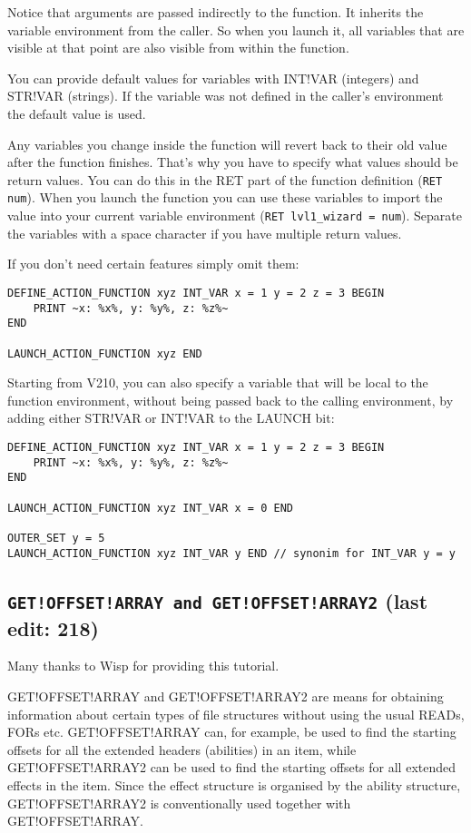 \documentclass{article}
\def\DEFINE#1{{\tt \bf #1}\label{#1}\index{#1}}
\begin{document}
Notice that arguments are passed indirectly to the function.
It inherits the variable environment from the caller. So when you launch it,
all variables that are visible at that point are also visible from within the function.

You can provide default values for variables with INT!VAR (integers) and STR!VAR (strings).
If the variable was not defined in the caller's environment the default value is used.

Any variables you change inside the function will revert back to their old value
after the function finishes.
That's why you have to specify what values should be return values.
You can do this in the RET part of the function definition (\verb+RET num+).
When you launch the function you can use these variables to import the value
into your current variable environment (\verb+RET lvl1_wizard = num+).
Separate the variables with a space character if you have multiple return values.

If you don't need certain features simply omit them:
\begin{verbatim}
DEFINE_ACTION_FUNCTION xyz INT_VAR x = 1 y = 2 z = 3 BEGIN
    PRINT ~x: %x%, y: %y%, z: %z%~
END

LAUNCH_ACTION_FUNCTION xyz END
\end{verbatim}

Starting from V210, you can also specify a variable that will be local to the
function environment, without being passed back to the calling environment,
by adding either STR!VAR or INT!VAR to the LAUNCH bit:
\begin{verbatim}
DEFINE_ACTION_FUNCTION xyz INT_VAR x = 1 y = 2 z = 3 BEGIN
    PRINT ~x: %x%, y: %y%, z: %z%~
END

LAUNCH_ACTION_FUNCTION xyz INT_VAR x = 0 END

OUTER_SET y = 5
LAUNCH_ACTION_FUNCTION xyz INT_VAR y END // synonim for INT_VAR y = y
\end{verbatim}

\subsection{\DEFINE{GET!OFFSET!ARRAY and GET!OFFSET!ARRAY2} (last edit: 218)}

Many thanks to Wisp for providing this tutorial.

GET!OFFSET!ARRAY and GET!OFFSET!ARRAY2 are means for obtaining information about certain types of file structures without using the usual READs, FORs etc. GET!OFFSET!ARRAY can, for example, be used to find the starting offsets for all the extended headers (abilities) in an item, while GET!OFFSET!ARRAY2 can be used to find the starting offsets for all extended effects in the item. Since the effect structure is organised by the ability structure, GET!OFFSET!ARRAY2 is conventionally used together with GET!OFFSET!ARRAY.
\end{document}
